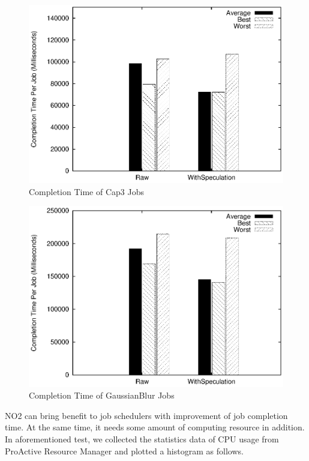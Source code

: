 \begin{figure}
\centering
\includegraphics[width=0.9\columnwidth]{figures/completiontime_cap3.eps}
\caption{Completion Time of Cap3 Jobs}
\label{figure:completiontime_cap3}
\end{figure}

\begin{figure}
\centering
\includegraphics[width=0.9\columnwidth]{figures/completiontime_gaussianblur.eps}
\caption{Completion Time of GaussianBlur Jobs}
\label{figure:completiontime_gaussianblur}
\end{figure}

NO2 can bring benefit to job schedulers with improvement of job completion time. At the same time, it needs some amount of computing resource in addition. In aforementioned test, we collected the statistics data of CPU usage from ProActive Resource Manager and plotted a histogram as follows.

